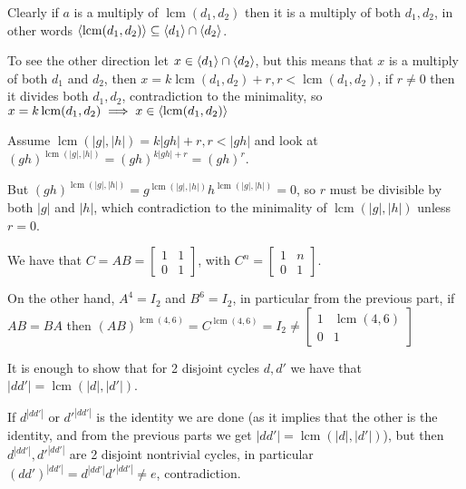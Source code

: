 \begin{cExercise}
	\begin{cPart}
		Clearly if $a$ is a multiply of $\operatorname{lcm}(d_1,d_2)$ then it is a multiply of both $d_1,d_2$, in other words $\left\langle\operatorname{lcm}(d_1,d_2)\right\rangle\subseteq \left\langle d_1\right\rangle\cap\left\langle d_2\right\rangle$.
		
		To see the other direction let $x\in \left\langle d_1\right\rangle\cap\left\langle d_2\right\rangle$, but this means that $x$ is a multiply of both $d_1$ and $d_2$, then $x=k\operatorname{lcm}(d_1,d_2)+r, r<\operatorname{lcm}(d_1,d_2)$, if $r\ne 0$ then it divides both $d_1,d_2$, contradiction to the minimality, so $x=k\operatorname{lcm}(d_1,d_2)\implies x\in \left\langle\operatorname{lcm}(d_1,d_2)\right\rangle$
	\end{cPart}
	\begin{cPart}
		Assume $\operatorname{lcm}(|g|,|h|)=k|gh|+r, r<|gh|$ and look at $(gh)^{\operatorname{lcm}(|g|,|h|)}=(gh)^{k|gh|+r}=(gh)^r$.
		
		But $(gh)^{\operatorname{lcm}(|g|,|h|)}=g^{\operatorname{lcm}(|g|,|h|)}h^{\operatorname{lcm}(|g|,|h|)}=0$, so $r$ must be divisible by both $|g|$ and $|h|$, which contradiction to the minimality of $\operatorname{lcm}(|g|,|h|)$ unless $r=0$.
	\end{cPart}
	\begin{cPart}
		We have that $C=AB=\begin{bmatrix}1&1\\0&1\end{bmatrix}$, with $C^n=\begin{bmatrix}1&n\\0&1\end{bmatrix}$.
		
		On the other hand, $A^4=I_2$ and $B^6=I_2$, in particular from the previous part, if $AB=BA$ then $(AB)^{\operatorname{lcm}(4,6)}=C^{\operatorname{lcm}(4,6)}=I_2\ne \begin{bmatrix}1&\operatorname{lcm}(4,6)\\0&1\end{bmatrix}$
	\end{cPart}
	\begin{cPart}
		It is enough to show that for 2 disjoint cycles $d,d'$ we have that $|dd'|=\operatorname{lcm}(|d|,|d'|)$.
		
		If $d^{|dd'|}$ or $d'^{|dd'|}$ is the identity we are done (as it implies that the other is the identity, and from the previous parts we get $|dd'|=\operatorname{lcm}(|d|,|d'|)$), but then $d^{|dd'|},d'^{|dd'|}$ are 2 disjoint nontrivial cycles, in particular $(dd')^{|dd'|}=d^{|dd'|}d'^{|dd'|}\ne e$, contradiction.
	\end{cPart}
\end{cExercise}
